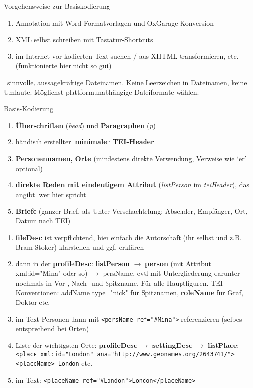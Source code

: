 \begin{frame}[allowframebreaks]{Vorgehensweise zur Basiskodierung}
\footnotesize
\begin{enumerate}
    \item Annotation mit Word-Formatvorlagen und OxGarage-Konversion
    \item XML selbst schreiben mit Tastatur-Shortcuts
    \item im Internet vor-kodierten Text suchen / aus XHTML transformieren, etc. (funktionierte hier nicht so gut)
\end{enumerate}
\smallskip

~sinnvolle, aussagekräftige Dateinamen. Keine Leerzeichen in Dateinamen, keine Umlaute. Möglichst plattformunabhängige Dateiformate wählen.


\end{frame}

\begin{frame}[allowframebreaks]{Basis-Kodierung}

\begin{enumerate}
    \item \textbf{Überschriften} (\emph{head}) und \textbf{Paragraphen} (\emph{p})
    \item händisch erstellter, \textbf{minimaler TEI-Header}
    \item \textbf{Personennamen, Orte} (mindestens direkte Verwendung, Verweise wie `er' optional)
    \item \textbf{direkte Reden mit eindeutigem Attribut} (\emph{listPerson} im \emph{teiHeader}), das angibt, wer hier spricht
    \item \textbf{Briefe} (ganzer Brief, als Unter-Verschachtelung: Absender, Empfänger, Ort, Datum nach TEI)
\end{enumerate}

\begin{enumerate}
    \item \textbf{fileDesc} ist verpflichtend, hier einfach die Autorschaft (ihr selbst und z.B. Bram Stoker) klarstellen und ggf. erklären
    \item dann in der \textbf{profileDesc}: \textbf{listPerson} $\to$ \textbf{person} (mit Attribut xml:id="Mina" oder so)  $\to$ persName, evtl mit Untergliederung darunter nochmals in Vor-, Nach- und Spitzname. Für alle Hauptfiguren. TEI-Konventionen: \href{http://www.tei-c.org/release/doc/tei-p5-doc/de/html/examples-addName.html}{addName} type="nick" für Spitznamen, \textbf{roleName} für Graf, Doktor etc.
    \item im Text Personen dann mit \texttt{<persName ref="\#Mina">} referenzieren (selbes entsprechend bei Orten)
    \item Liste der wichtigsten Orte: \textbf{profileDesc} $\to$ \textbf{settingDesc} $\to$ \textbf{listPlace}: \texttt{<place xml:id="London"  ana="http://www.geonames.org/2643741/"> <placeName> London} etc.
    \item im Text: \texttt{<placeName ref="\#London">London</placeName>}
\end{enumerate}

\end{frame}

